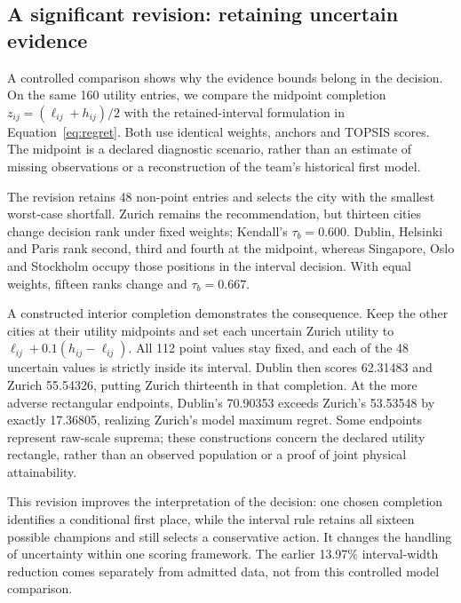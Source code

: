 \subsection{A significant revision: retaining uncertain evidence}
A controlled comparison shows why the evidence bounds belong in the decision.
On the same 160 utility entries, we compare the midpoint completion
$z_{ij}=(\ell_{ij}+h_{ij})/2$ with the retained-interval formulation in
Equation~\ref{eq:regret}. Both use identical weights, anchors and TOPSIS scores.
The midpoint is a declared diagnostic scenario, rather than an estimate of
missing observations or a reconstruction of the team's historical first model.

The revision retains 48 non-point entries and selects the city with the smallest
worst-case shortfall. Zurich remains the recommendation, but thirteen cities
change decision rank under fixed weights; Kendall's $\tau_b=0.600$.
Dublin, Helsinki and Paris rank second, third and fourth at the midpoint,
whereas Singapore, Oslo and Stockholm occupy those positions in the interval
decision. With equal weights, fifteen ranks change and $\tau_b=0.667$.

A constructed interior completion demonstrates the consequence. Keep the other
cities at their utility midpoints and set each uncertain Zurich utility to
$\ell_{ij}+0.1(h_{ij}-\ell_{ij})$. All 112 point values stay fixed, and each
of the 48 uncertain values is strictly inside its interval. Dublin then scores
62.31483 and Zurich 55.54326, putting Zurich thirteenth in that completion.
At the more adverse rectangular endpoints, Dublin's 70.90353 exceeds Zurich's
53.53548 by exactly 17.36805, realizing Zurich's model maximum regret.
Some endpoints represent raw-scale suprema; these constructions concern the
declared utility rectangle, rather than an observed population or a proof of
joint physical attainability.

This revision improves the interpretation of the decision: one chosen completion
identifies a conditional first place, while the interval rule retains all sixteen
possible champions and still selects a conservative action. It changes the
handling of uncertainty within one scoring framework. The earlier 13.97\%
interval-width reduction comes separately from admitted data, not from this
controlled model comparison.
